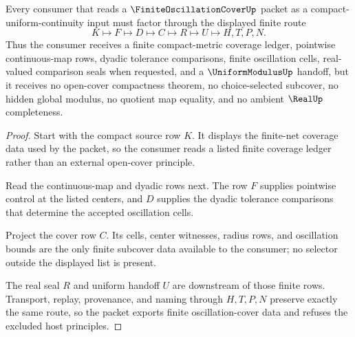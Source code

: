 \begin{theorem}
\label{thm:finite-oscillation-cover-finite-subcover-route}
Every consumer that reads a $\FiniteOscillationCoverUp$ packet as a compact-uniform-continuity input must factor through the displayed finite route
$$
K \longmapsto F \longmapsto D \longmapsto C \longmapsto R \longmapsto U \longmapsto H,T,P,N .
$$
Thus the consumer receives a finite compact-metric coverage ledger, pointwise continuous-map rows, dyadic tolerance comparisons, finite oscillation cells, real-valued comparison seals when requested, and a $\UniformModulusUp$ handoff, but it receives no open-cover compactness theorem, no choice-selected subcover, no hidden global modulus, no quotient map equality, and no ambient $\RealUp$ completeness.
\end{theorem}
\begin{proof}
Start with the compact source row $K$. It displays the finite-net coverage data used by the packet, so the consumer reads a listed finite coverage ledger rather than an external open-cover principle.

Read the continuous-map and dyadic rows next. The row $F$ supplies pointwise control at the listed centers, and $D$ supplies the dyadic tolerance comparisons that determine the accepted oscillation cells.

Project the cover row $C$. Its cells, center witnesses, radius rows, and oscillation bounds are the only finite subcover data available to the consumer; no selector outside the displayed list is present.

The real seal $R$ and uniform handoff $U$ are downstream of those finite rows. Transport, replay, provenance, and naming through $H,T,P,N$ preserve exactly the same route, so the packet exports finite oscillation-cover data and refuses the excluded host principles.
\end{proof}



